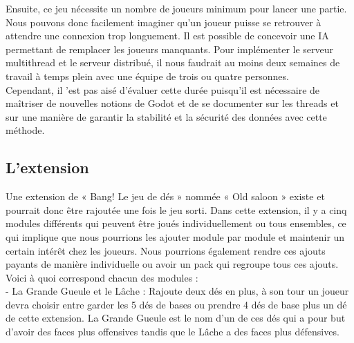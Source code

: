 \documentclass[a4paper,11pt]{article}
\begin{document}
    Ensuite, ce jeu nécessite un nombre de joueurs minimum pour lancer une partie. Nous pouvons donc facilement imaginer qu’un joueur puisse se retrouver à attendre une connexion trop longuement. Il est possible de concevoir une IA permettant de remplacer les joueurs manquants.
    Pour implémenter le serveur multithread et le serveur distribué, il nous faudrait au moins deux semaines de travail à temps plein avec une équipe de trois ou quatre personnes. \\

    Cependant, il 'est pas aisé d'évaluer cette durée puisqu'il est nécessaire de maîtriser de nouvelles notions de Godot et de se documenter sur les threads et sur une manière de garantir la stabilité et la sécurité des données avec cette méthode.  \\


\subsection{L’extension}


    Une extension de « Bang! Le jeu de dés » nommée « Old saloon » existe et pourrait donc être rajoutée une fois le jeu sorti. Dans cette extension, il y a cinq modules différents qui peuvent être joués individuellement ou tous ensembles, ce qui implique que nous pourrions les ajouter module par module et maintenir un certain intérêt chez les joueurs. Nous pourrions également rendre ces ajouts payants de manière individuelle ou avoir un pack qui regroupe tous ces ajouts.\\

	Voici à quoi correspond chacun des modules : \\
    - La Grande Gueule et le Lâche : Rajoute deux dés en plus, à son tour un joueur devra choisir entre garder les 5 dés de bases ou prendre 4 dés de base plus un dé de cette extension. La Grande Gueule est le nom d’un de ces dés qui a pour but d’avoir des faces plus offensives tandis que le Lâche a des faces plus défensives. \\

\newpage
\end{document}
